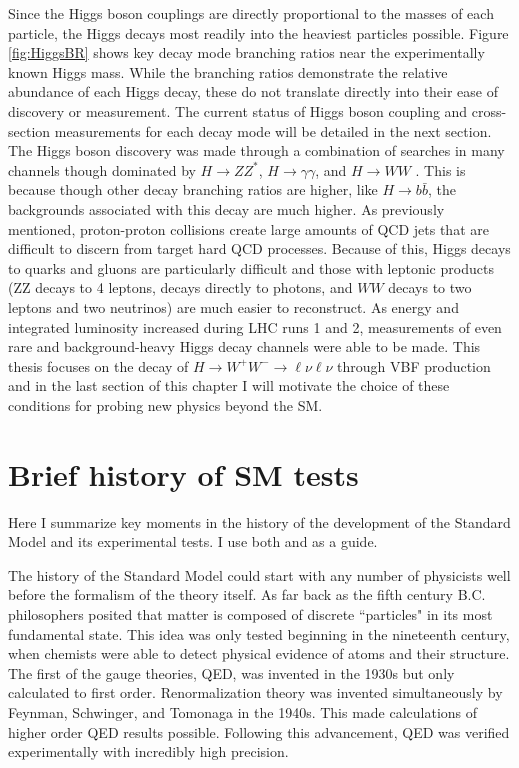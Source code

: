 Since the Higgs boson couplings are directly proportional to the masses of each particle, the Higgs decays most readily into the heaviest particles possible. Figure \ref{fig:HiggsBR} shows key decay mode branching ratios near the experimentally known Higgs mass. While the branching ratios demonstrate the relative abundance of each Higgs decay, these do not translate directly into their ease of discovery or measurement. The current status of Higgs boson coupling and cross-section measurements for each decay mode will be detailed in the next section. The Higgs boson discovery was made through a combination of searches in many channels though dominated by $H\rightarrow ZZ^*$, $H\rightarrow\gamma\gamma$, and $H\rightarrow WW$ \cite{Higgsdiscovery}. This is because though other decay branching ratios are higher, like $H\rightarrow b\bar{b}$, the backgrounds associated with this decay are much higher. As previously mentioned, proton-proton collisions create large amounts of QCD jets that are difficult to discern from target hard QCD processes. Because of this, Higgs decays to quarks and gluons are particularly difficult and those with leptonic products (ZZ decays to 4 leptons, decays directly to photons, and $WW$ decays to two leptons and two neutrinos) are much easier to reconstruct. As energy and integrated luminosity increased during LHC runs 1 and 2, measurements of even rare and background-heavy Higgs decay channels were able to be made.  This thesis focuses on the decay of $H\rightarrow W^+W^-\rightarrow \ell\nu\ell\nu$ through VBF production and in the last section of this chapter I will motivate the choice of these conditions for probing new physics beyond the SM.   

\section{Brief history of SM tests}
Here I summarize key moments in the history of the development of the Standard Model and its experimental tests. I use both \cite{Kibble} and \cite{HistoryBook} as a guide.

The history of the Standard Model could start with any number of physicists well before the formalism of the theory itself. As far back as the fifth century B.C. philosophers posited that matter is composed of discrete ``particles" in its most fundamental state. This idea was only tested beginning in the nineteenth century, when chemists were able to detect physical evidence of atoms and their structure. The first of the gauge theories, QED, was invented in the 1930s but only calculated to first order. Renormalization theory was invented simultaneously by Feynman, Schwinger, and Tomonaga in the 1940s. This made calculations of higher order QED results possible. Following this advancement, QED was verified experimentally with incredibly high precision. 

